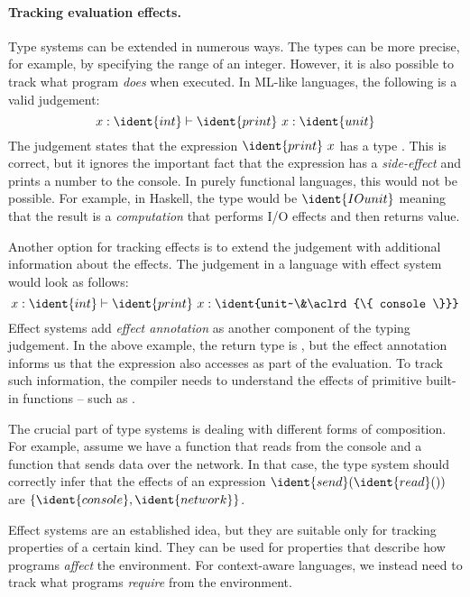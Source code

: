\paragraph{Tracking evaluation effects.}
Type systems can be extended in numerous ways. The types can be more precise, for example, by specifying
the range of an integer. However, it is also possible to track what program \emph{does} when executed.
In ML-like languages, the following is a valid judgement:
%
\begin{equation*}
x\-:\-\ident{int} \vdash \ident{print}~x : \ident{unit}
\end{equation*}
%
The judgement states that the expression $\ident{print}~x$ has a type . This is correct, 
but it ignores the important fact that the expression has a \emph{side-effect} and prints a number
to the console. In purely functional languages, this would not be possible. For example, in Haskell,
the type would be $\ident{IO unit}$ meaning that the result is a \emph{computation} that performs I/O
effects and then returns  value. 

Another option for tracking effects is to extend the judgement with additional information 
about the effects. The judgement in a language with effect system would look as follows:
%
\begin{equation*}
x\-:\-\ident{int} \vdash \ident{print}~x : \ident{unit~\&\aclrd{\{ console \}}}
\end{equation*}
%
Effect systems add \emph{effect annotation} as another component of the typing judgement. In the above
example, the return type is , but the effect annotation informs us that the expression
also accesses  as part of the evaluation. To track such information, the compiler needs
to understand the effects of primitive built-in functions -- such as .

The crucial part of type systems is dealing with different forms of composition. For example, assume
we have a function  that reads from the console and a function  that sends
data over the network. In that case, the type system should correctly infer that the effects of an 
expression $\ident{send}(\ident{read}())$ are $\{ \ident{console}, \ident{network} \}$.

Effect systems are an established idea, but they are suitable only for tracking properties of a
certain kind. They can be used for properties that describe how programs \emph{affect} the environment.
For context-aware languages, we instead need to track what programs \emph{require} from the environment.

